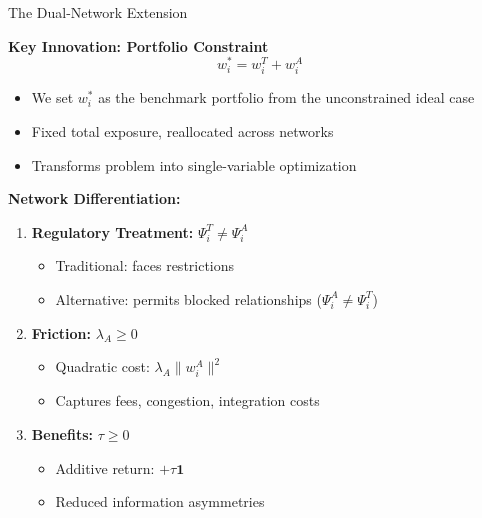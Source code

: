 \documentclass[aspectratio=169]{beamer}
\begin{document}
\begin{frame}{The Dual-Network Extension}
    
    \textbf{Key Innovation: Portfolio Constraint}
    \begin{equation*}
    \boxed{w_i^* = w_i^T + w_i^A}
    \end{equation*}
    
    \begin{itemize}
        \item We set $w_i^*$ as the benchmark portfolio from the unconstrained ideal case
        \item Fixed total exposure, reallocated across networks
        \item Transforms problem into single-variable optimization
    \end{itemize}
    
    \vspace{0.3cm}
    \textbf{Network Differentiation:}
    
    \begin{enumerate}
        \item \textbf{Regulatory Treatment:} $\Psi_i^T \neq \Psi_i^A$
        \begin{itemize}
            \item Traditional: faces restrictions
            \item Alternative: permits blocked relationships ($\Psi_i^A \neq \Psi_i^T$)
        \end{itemize}
        
        \item \textbf{Friction:} $\lambda_A \geq 0$
        \begin{itemize}
            \item Quadratic cost: $\lambda_A \|w_i^A\|^2$
            \item Captures fees, congestion, integration costs
        \end{itemize}
        
        \item \textbf{Benefits:} $\tau \geq 0$
        \begin{itemize}
            \item Additive return: $+\tau \mathbf{1}$
            \item Reduced information asymmetries
        \end{itemize}
    \end{enumerate}

\end{frame}
\end{document}

